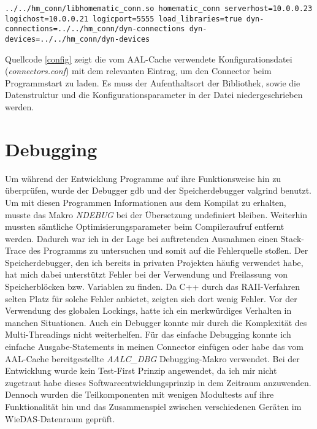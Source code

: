\begin{lstlisting}[frame=single,caption={Konfigurationseintrag des Connectors für den AAL-Cache},label=config]
../../hm_conn/libhomematic_conn.so homematic_conn serverhost=10.0.0.23 logichost=10.0.0.21 logicport=5555 load_libraries=true dyn-connections=../../hm_conn/dyn-connections dyn-devices=../../hm_conn/dyn-devices
\end{lstlisting}
Quellcode \ref{config} zeigt die vom AAL-Cache verwendete Konfigurationsdatei (\emph{connectors.conf}) mit dem
relevanten Eintrag, um den Connector beim Programmstart zu laden.
Es muss der Aufenthaltsort der Bibliothek, sowie die Datenstruktur und die Konfigurationsparameter in der Datei
niedergeschrieben werden.

\section{Debugging}
\label{imp_dbg}

Um während der Entwicklung Programme auf ihre Funktionsweise hin zu überprüfen, wurde der Debugger gdb \cite{gdb}
und der Speicherdebugger valgrind \cite{valgrind} benutzt.
Um mit diesen Programmen Informationen aus dem Kompilat zu erhalten, musste das Makro \emph{NDEBUG} bei der Übersetzung
undefiniert bleiben.
Weiterhin mussten sämtliche Optimisierungsparameter beim Compileraufruf entfernt werden.
Dadurch war ich in der Lage bei auftretenden Ausnahmen einen Stack-Trace des Programms zu untersuchen und somit
auf die Fehlerquelle stoßen.
Der Speicherdebugger, den ich bereits in privaten Projekten häufig verwendet habe, hat mich dabei unterstützt
Fehler bei der Verwendung und Freilassung von Speicherblöcken bzw. Variablen zu finden.
Da C++ durch das RAII-Verfahren selten Platz für solche Fehler anbietet, zeigten sich dort wenig Fehler.
Vor der Verwendung des globalen Lockings, hatte ich ein merkwürdiges Verhalten in manchen Situationen.
Auch ein Debugger konnte mir durch die Komplexität des Multi-Threadings nicht weiterhelfen.
Für das einfache Debugging konnte ich einfache Ausgabe-Statements in meinen Connector einfügen oder habe das vom
AAL-Cache bereitgestellte \emph{AALC\_DBG} Debugging-Makro verwendet.
Bei der Entwicklung wurde kein Test-First Prinzip angewendet, da ich mir nicht zugetraut habe dieses Softwareentwicklungsprinzip
in dem Zeitraum anzuwenden.
Dennoch wurden die Teilkomponenten mit wenigen Modultests auf ihre Funktionalität hin und das Zusammenspiel zwischen verschiedenen
Geräten im WieDAS-Datenraum geprüft.

